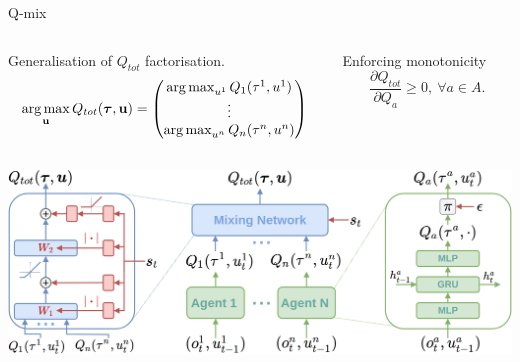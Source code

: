 \documentclass{beamer}
\begin{document}
    \begin{frame}{Q-mix}
        \vspace{-0.5cm}
        \begin{columns}
            \pause
            \begin{column}{0.62\textwidth}
                \begin{block}{Generalisation of $Q_{tot}$ factorisation.}
                    \begin{equation}
                        \operatorname*{arg\,max}_{\mathbf{u}}Q_{tot}(\boldsymbol{\tau}, \mathbf{u}) =
                        \begin{pmatrix}
                            \operatorname*{arg\,max}_{u^1}Q_1(\tau^1, u^1)   \\
                            \vdots \\
                            \operatorname*{arg\,max}_{u^n}Q_n(\tau^n, u^n) \\
                        \end{pmatrix}\nonumber
                    \end{equation}
                \end{block}
            \end{column}
            \pause
            \begin{column}{0.33\textwidth}  %
                \begin{minipage}[c][0.5\textheight][c]{\linewidth}
                    \begin{block}{Enforcing monotonicity}
                        \begin{equation}
                            \frac{\partial Q_{tot}}{\partial Q_a}  \geq 0,~ \forall a \in A. \nonumber
                        \end{equation}
                    \end{block}
                \end{minipage}
            \end{column}
        \end{columns}

        \pause
        \begin{center}
            \includegraphics[width=0.75\linewidth]{img/QMIX.png}
        \end{center}


    \end{frame}
\end{document}
